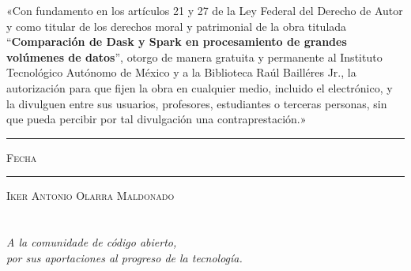 \documentclass[11pt, oneside]{book}
\begin{document}

\thispagestyle{empty}

\vspace*{\fill}
\begingroup

\noindent
«Con fundamento en los artículos 21 y 27 de la Ley Federal del Derecho de Autor y como titular de los derechos moral y patrimonial de la obra titulada ``\textbf{Comparación de Dask y Spark en procesamiento de grandes volúmenes de datos}'', otorgo de manera gratuita y permanente al Instituto Tecnológico Autónomo de México y a la Biblioteca Raúl Bailléres Jr., la autorización para que fijen la obra en cualquier medio, incluido el electrónico, y la divulguen entre sus usuarios, profesores, estudiantes o terceras personas, sin que pueda percibir por tal divulgación una contraprestación.»


\centering 

\vspace{5em}

\rule[1em]{20em}{0.5pt} %

\textsc{Fecha}
 
\vspace{8em}

\rule[1em]{20em}{0.5pt} %

\textsc{Iker Antonio Olarra Maldonado}

\endgroup
\vspace*{\fill}


\pagestyle{plain}
\frontmatter

\chapter*{}
\begin{flushright}
\textit{A la comunidade de código abierto,\\ por sus aportaciones al progreso de la tecnología.}
\end{flushright}

\end{document}
